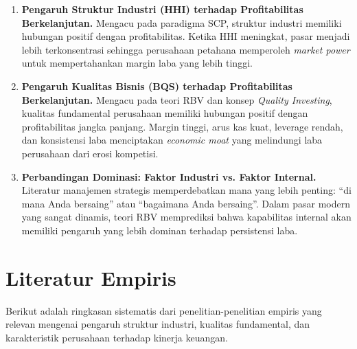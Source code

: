 \documentclass[12pt,a4paper]{report}
\begin{document}
\begin{enumerate}
    \item \textbf{Pengaruh Struktur Industri (HHI) terhadap Profitabilitas Berkelanjutan.} Mengacu pada paradigma SCP, struktur industri memiliki hubungan positif dengan profitabilitas. Ketika HHI meningkat, pasar menjadi lebih terkonsentrasi sehingga perusahaan petahana memperoleh \textit{market power} untuk mempertahankan margin laba yang lebih tinggi.
    \item \textbf{Pengaruh Kualitas Bisnis (BQS) terhadap Profitabilitas Berkelanjutan.} Mengacu pada teori RBV dan konsep \textit{Quality Investing}, kualitas fundamental perusahaan memiliki hubungan positif dengan profitabilitas jangka panjang. Margin tinggi, arus kas kuat, leverage rendah, dan konsistensi laba menciptakan \textit{economic moat} yang melindungi laba perusahaan dari erosi kompetisi.
    \item \textbf{Perbandingan Dominasi: Faktor Industri vs. Faktor Internal.} Literatur manajemen strategis memperdebatkan mana yang lebih penting: ``di mana Anda bersaing'' atau ``bagaimana Anda bersaing''. Dalam pasar modern yang sangat dinamis, teori RBV memprediksi bahwa kapabilitas internal akan memiliki pengaruh yang lebih dominan terhadap persistensi laba.
\end{enumerate}

\section{Literatur Empiris}

Berikut adalah ringkasan sistematis dari penelitian-penelitian empiris yang relevan mengenai pengaruh struktur industri, kualitas fundamental, dan karakteristik perusahaan terhadap kinerja keuangan.
\end{document}
